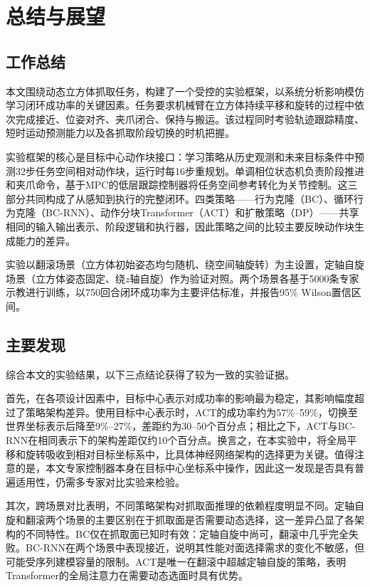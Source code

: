 \chapter{总结与展望}\label{chap:conclusion}

\section{工作总结}

本文围绕动态立方体抓取任务，构建了一个受控的实验框架，以系统分析影响模仿学习闭环成功率的关键因素。任务要求机械臂在立方体持续平移和旋转的过程中依次完成接近、位姿对齐、夹爪闭合、保持与搬运。该过程同时考验轨迹跟踪精度、短时运动预测能力以及各抓取阶段切换的时机把握。

实验框架的核心是目标中心动作块接口：学习策略从历史观测和未来目标条件中预测32步任务空间相对动作块，运行时每16步重规划。单调相位状态机负责阶段推进和夹爪命令，基于MPC的低层跟踪控制器将任务空间参考转化为关节控制。这三部分共同构成了从感知到执行的完整闭环。四类策略——行为克隆（BC）、循环行为克隆（BC-RNN）、动作分块Transformer（ACT）和扩散策略（DP）——共享相同的输入输出表示、阶段逻辑和执行器，因此策略之间的比较主要反映动作块生成能力的差异。

实验以翻滚场景（立方体初始姿态均匀随机、绕空间轴旋转）为主设置，定轴自旋场景（立方体姿态固定、绕$z$轴自旋）作为验证对照。两个场景各基于5000条专家示教进行训练，以750回合闭环成功率为主要评估标准，并报告95\% Wilson置信区间。

\section{主要发现}

综合本文的实验结果，以下三点结论获得了较为一致的实验证据。

首先，在各项设计因素中，目标中心表示对成功率的影响最为稳定，其影响幅度超过了策略架构差异。使用目标中心表示时，ACT的成功率约为57\%--59\%，切换至世界坐标表示后降至9\%--27\%，差距约为30--50个百分点；相比之下，ACT与BC-RNN在相同表示下的架构差距仅约10个百分点。换言之，在本实验中，将全局平移和旋转吸收到相对目标坐标系中，比具体神经网络架构的选择更为关键。值得注意的是，本文专家控制器本身在目标中心坐标系中操作，因此这一发现是否具有普遍适用性，仍需多专家对比实验来检验。

其次，跨场景对比表明，不同策略架构对抓取面推理的依赖程度明显不同。定轴自旋和翻滚两个场景的主要区别在于抓取面是否需要动态选择，这一差异凸显了各架构的不同特性。BC仅在抓取面已知时有效：定轴自旋中尚可，翻滚中几乎完全失败。BC-RNN在两个场景中表现接近，说明其性能对面选择需求的变化不敏感，但可能受序列建模容量的限制。ACT是唯一在翻滚中超越定轴自旋的策略，表明Transformer的全局注意力在需要动态选面时具有优势。

